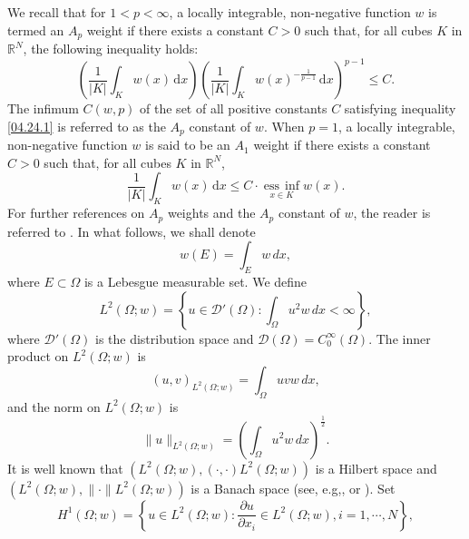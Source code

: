 \documentclass[11pt]{article}
\numberwithin{equation}{section}
\def\essinf{\operatorname*{ess\ \! inf}}
\begin{document}
 We recall that for $1 < p < \infty$, a locally integrable, non-negative function $w$ is termed an $A_p$ weight if there exists a constant $C > 0$ such that, for all cubes $K$ in $\mathbb{R}^N$, the following inequality holds:
\begin{equation}\label{04.24.1}
\left(\frac{1}{|K|}\int_K w(x)\, \mathrm{d}x\right)\left(\frac{1}{|K|}\int_K w(x)^{-\frac{1}{p-1}}\, \mathrm{d}x\right)^{p-1} \leq C.
\end{equation}
The infimum $C(w,p)$ of the set of all positive constants $C$ satisfying inequality \eqref{04.24.1} is referred to as the $A_p$ constant of $w$. When $p = 1$, a locally integrable, non-negative function $w$ is said to be an $A_1$ weight if there exists a constant $C > 0$ such that, for all cubes $K$ in $\mathbb{R}^N$,
\begin{equation*}
\frac{1}{|K|}\int_K w(x)\, \mathrm{d}x \leq C \cdot \essinf_{x \in K} w(x).
\end{equation*}
For further references on $A_p$ weights and the $A_p$ constant of $w$, the reader is referred  to \cite{FF, Garcia-Cuerva, Heinonen}.
In what follows, we shall denote
\begin{equation*}
w(E) = \int_E w \, dx,
\end{equation*}
where $E \subset \Omega$ is a Lebesgue measurable set.
We define
\begin{equation*}
L^2(\Omega; w) = \left\{u \in \mathcal{D}'(\Omega) \colon \int_\Omega u^2 w \, dx < \infty\right\},
\end{equation*}
where $\mathcal{D}'(\Omega)$ is the distribution space and $\mathcal{D}(\Omega) = C_0^\infty(\Omega)$.
The inner product on $L^2(\Omega; w)$ is
\begin{equation*}
(u, v)_{L^2(\Omega; w)} = \int_\Omega uvw \, dx,
\end{equation*}
and the norm on $L^2(\Omega; w)$ is
\begin{equation*}
\|u\|_{L^2(\Omega; w)} = \left(\int_\Omega u^2 w \, dx\right)^{\frac{1}{2}}.
\end{equation*}
It is well known that $(L^2(\Omega; w), (\cdot, \cdot){L^2(\Omega; w)})$ is a Hilbert space and $(L^2(\Omega; w), \|\cdot\|{L^2(\Omega; w)})$ is a Banach space (see, e.g,\cite[chapter 1]{Heinonen}, or  \cite[chapter IV]{Garcia-Cuerva}).
Set
\begin{equation*}
H^1(\Omega; w) = \left\{u \in L^2(\Omega; w) \colon \frac{\partial u}{\partial x_i} \in L^2(\Omega; w), i = 1, \cdots, N\right\},
\end{equation*}
\end{document}
